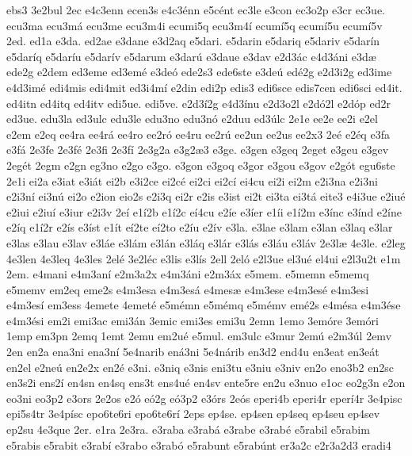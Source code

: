 {ebs3
3e2bul
2ec
e4c3enn
ecen3s
e4c3^^e9nn
e5c^^e9nt
ec3le
e3con
ec3o2p
e3cr
ec3ue.
ecu3ma
ecu3m^^e1
ecu3me
ecu3m4i
ecumi5q
ecu3m4^^ed
ecum^^ed5q
ecum^^ed5u
ecum^^ed5v
2ed.
ed1a
e3da.
ed2ae
e3dane
e3d2aq
e5dari.
e5darin
e5dariq
e5dariv
e5dar^^edn
e5dar^^edq
e5dar^^edu
e5dar^^edv
e5darum
e3dar^^fa
e3daue
e3dav
e2d3^^e1c
e4d3^^e1ni
e3d^^e6
ede2g
e2dem
ed3eme
ed3em^^e9
e3de^^f3
ede2s3
ede6ste
e3de^^fa
ed^^e92g
e2d3i2g
ed3ime
e4d3im^^e9
edi4mis
edi4mit
ed3i4m^^ed
e2din
edi2p
edis3
edi6sce
edis7cen
edi6sci
ed4it.
ed4itn
ed4itq
ed4itv
edi5ue.
edi5ve.
e2d3^^ed2g
e4d3^^ednu
e2d3o2l
e2d^^f32l
e2d^^f3p
ed2r
ed3ue.
edu3la
ed3ulc
edu3le
edu3no
edu3n^^f3
e2duu
ed3^^falc
2e1e
ee2e
ee2i
e2el
e2em
e2eq
ee4ra
ee4r^^e1
ee4ro
ee2r^^f3
ee4ru
ee2r^^fa
ee2un
ee2us
ee2x3
2e^^e9
e2^^e9q
e3fa
e3f^^e1
2e3fe
2e3f^^e9
2e3fi
2e3f^^ed
2e3g2a
e3g2^^e63
e3ge.
e3gen
e3geq
2eget
e3geu
e3gev
2eg^^e9t
2egm
e2gn
eg3no
e2go
e3go.
e3gon
e3goq
e3gor
e3gou
e3gov
e2g^^f3t
egu6ste
2e1i
ei2a
e3iat
e3i^^e1t
ei2b
e3i2ce
ei2c^^e9
ei2ci
ei2c^^ed
ei4cu
ei2i
ei2m
e2i3na
e2i3ni
e2i3n^^ed
ei3n^^fa
ei2o
e2ion
eio2s
e2i3q
ei2r
e2is
e3ist
ei2t
ei3ta
ei3t^^e1
eite3
e4i3ue
e2iu^^e9
e2iui
e2iu^^ed
e3iur
e2i3v
2e^^ed
e1^^ed2b
e1^^ed2c
e^^ed4cu
e2^^ede
e3^^eder
e1^^edi
e1^^ed2m
e3^^ednc
e3^^ednd
e2^^edne
e2^^edq
e1^^ed2r
e2^^eds
e3^^edst
e1^^edt
e^^ed2te
e^^ed2to
e2^^edu
e2^^edv
e3la.
e3lae
e3lam
e3lan
e3laq
e3lar
e3las
e3lau
e3lav
e3l^^e1e
e3l^^e1m
e3l^^e1n
e3l^^e1q
e3l^^e1r
e3l^^e1s
e3l^^e1u
e3l^^e1v
2e3l^^e6
4e3le.
e2leg
4e3len
4e3leq
4e3les
2el^^e9
3e2l^^e9c
e3lis
e3l^^eds
2ell
2el^^f3
e2l3ue
el3u^^e9
el4ui
e2l3u2t
e1m
2em.
e4mani
e4m3an^^ed
e2m3a2x
e4m3^^e1ni
e2m3^^e1x
e5mem.
e5memn
e5memq
e5memv
em2eq
eme2s
e4m3esa
e4m3es^^e1
e4mes^^e6
e4m3ese
e4m3es^^e9
e4m3esi
e4m3es^^ed
em3ess
4emete
4emet^^e9
e5m^^e9mn
e5m^^e9mq
e5m^^e9mv
em^^e92s
e4m^^e9sa
e4m3^^e9se
e4m3^^e9si
em2i
emi3ac
emi3^^e1n
3emic
emi3es
emi3u
2emn
1emo
3em^^f3re
3em^^f3ri
1emp
em3pn
2emq
1emt
2emu
em2u^^e9
e5mul.
em3ulc
e3mur
2em^^fa
e2m3^^fal
2emv
2en
en2a
ena3ni
ena3n^^ed
5e4narib
en^^e13ni
5e4n^^e1rib
en3d2
end4u
en3eat
en3e^^e1t
en2el
e2ne^^fa
en2e2x
en2^^e9
e3ni.
e3niq
e3nis
eni3tu
e3niu
e3niv
en2o
eno3b2
en2sc
en3s2i
ens2^^ed
en4sn
en4sq
ens3t
ens4u^^e9
en4sv
ente5re
en2u
e3nuo
e1oc
eo2g3n
e2on
eo3ni
eo3p2
e3ors
2e2os
e2^^f3
e^^f32g
e^^f33p2
e3^^f3rs
2e^^f3s
eperi4b
eperi4r
eper^^ed4r
3e4pisc
epi5s4tr
3e4p^^edsc
epo6te6ri
epo6te6r^^ed
2eps
ep4se.
ep4sen
ep4seq
ep4seu
ep4sev
ep2su
4e3que
2er.
e1ra
2e3ra.
e3raba
e3rab^^e1
e3rabe
e3rab^^e9
e5rabil
e5rabim
e5rabis
e5rabit
e3rab^^ed
e3rabo
e3rab^^f3
e5rabunt
e5rab^^fant
er3a2c
e2r3a2d3
eradi4
}
